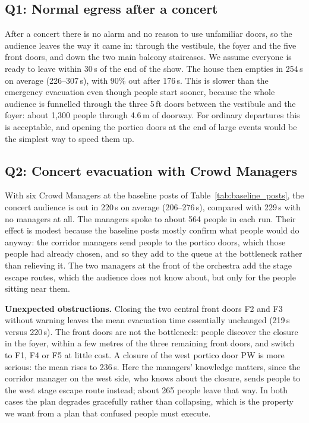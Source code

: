 \documentclass{article}
\begin{document}
\subsection{Q1: Normal egress after a concert}
After a concert there is no alarm and no reason to use unfamiliar doors, so the audience leaves the way it came in: through the vestibule, the foyer and the five front doors, and down the two main balcony staircases. We assume everyone is ready to leave within 30\,s of the end of the show. The house then empties in 254\,s on average (226--307\,s), with 90\% out after 176\,s. This is slower than the emergency evacuation even though people start sooner, because the whole audience is funnelled through the three 5\,ft doors between the vestibule and the foyer: about 1,300 people through 4.6\,m of doorway. For ordinary departures this is acceptable, and opening the portico doors at the end of large events would be the simplest way to speed them up.

\subsection{Q2: Concert evacuation with Crowd Managers}
With six Crowd Managers at the baseline posts of Table~\ref{tab:baseline_posts}, the concert audience is out in 220\,s on average (206--276\,s), compared with 229\,s with no managers at all. The managers spoke to about 564 people in each run. Their effect is modest because the baseline posts mostly confirm what people would do anyway: the corridor managers send people to the portico doors, which those people had already chosen, and so they add to the queue at the bottleneck rather than relieving it. The two managers at the front of the orchestra add the stage escape routes, which the audience does not know about, but only for the people sitting near them.

\textbf{Unexpected obstructions.} Closing the two central front doors F2 and F3 without warning leaves the mean evacuation time essentially unchanged (219\,s versus 220\,s). The front doors are not the bottleneck: people discover the closure in the foyer, within a few metres of the three remaining front doors, and switch to F1, F4 or F5 at little cost. A closure of the west portico door PW is more serious: the mean rises to 236\,s. Here the managers' knowledge matters, since the corridor manager on the west side, who knows about the closure, sends people to the west stage escape route instead; about 265 people leave that way. In both cases the plan degrades gracefully rather than collapsing, which is the property we want from a plan that confused people must execute.
\end{document}
